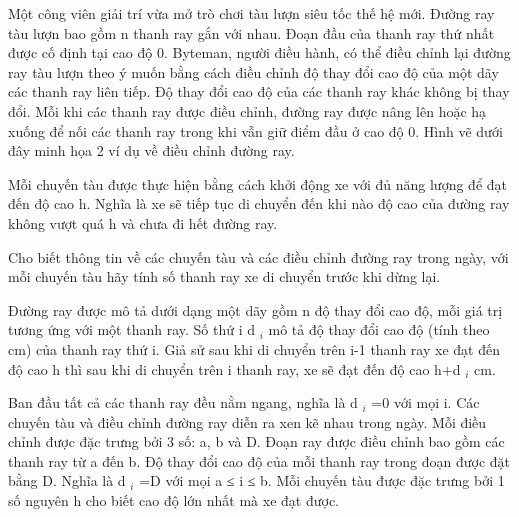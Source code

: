 Một công viên giải trí vừa mở trò chơi tàu lượn siêu tốc thế hệ mới. Đường ray tàu lượn bao gồm n thanh ray gắn với   nhau. Đoạn đầu của thanh ray thứ nhất được cố định tại cao độ 0. Byteman, người điều hành, có thể điều chỉnh lại đường   ray tàu lượn theo ý muốn bằng cách điều chỉnh       độ thay đổi cao độ      của một dãy các thanh ray liên tiếp. Độ thay   đổi cao độ của các thanh ray khác không bị thay đổi. Mỗi khi các thanh ray được điều chỉnh, đường ray được nâng lên   hoặc hạ xuống để nối các thanh ray trong khi vẫn giữ điểm đầu ở cao độ 0. Hình vẽ dưới đây minh họa 2 ví dụ về điều  chỉnh đường ray.  

   Mỗi chuyến tàu được thực hiện bằng cách khởi động xe với đủ năng lượng để đạt đến độ cao h. Nghĩa là xe sẽ tiếp tục   di chuyển đến khi nào độ cao của đường ray không vượt quá h và chưa đi hết đường ray.  

   Cho biết thông tin về các chuyến tàu và các điều chỉnh đường ray trong ngày, với mỗi chuyến tàu hãy tính số thanh ray   xe di chuyển trước khi dừng lại.  

   Đường ray được mô tả dưới dạng một dãy gồm n độ thay đổi cao độ, mỗi giá trị tương ứng với một thanh ray. Số thứ i   d   $_    i   $   mô tả độ thay đổi cao độ (tính theo cm) của thanh ray thứ i. Giả sử sau khi di chuyển trên i-1 thanh ray xe   đạt đến độ cao h thì sau khi di chuyển trên i thanh ray, xe sẽ đạt đến độ cao h+d   $_    i   $   cm.  

   Ban đầu tất cả các thanh ray đều nằm ngang, nghĩa là d   $_    i   $   =0 với mọi i. Các chuyến tàu và điều chỉnh đường   ray diễn ra xen kẽ nhau trong ngày. Mỗi điều chỉnh được đặc trưng bởi 3 số: a, b và D. Đoạn ray được điều chỉnh bao gồm   các thanh ray từ a đến b. Độ thay đổi cao độ của mỗi thanh ray trong đoạn được đặt bằng D. Nghĩa là d   $_    i   $   =D   với mọi a ≤ i ≤ b. Mỗi chuyến tàu được đặc trưng bởi 1 số nguyên h cho biết cao độ lớn nhất mà xe đạt được.  

\